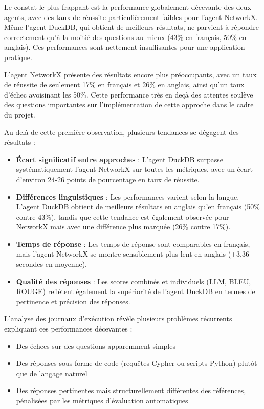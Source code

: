 \documentclass[a4paper,11pt]{article}
\begin{document}
Le constat le plus frappant est la performance globalement décevante des deux agents, avec des taux de réussite particulièrement faibles pour l'agent NetworkX. Même l'agent DuckDB, qui obtient de meilleurs résultats, ne parvient à répondre correctement qu'à la moitié des questions au mieux (43\% en français, 50\% en anglais). Ces performances sont nettement insuffisantes pour une application pratique.

L'agent NetworkX présente des résultats encore plus préoccupants, avec un taux de réussite de seulement 17\% en français et 26\% en anglais, ainsi qu'un taux d'échec avoisinant les 50\%. Cette performance très en deçà des attentes soulève des questions importantes sur l'implémentation de cette approche dans le cadre du projet.

Au-delà de cette première observation, plusieurs tendances se dégagent des résultats :

\begin{itemize}
    \item \textbf{Écart significatif entre approches} : L'agent DuckDB surpasse systématiquement l'agent NetworkX sur toutes les métriques, avec un écart d'environ 24-26 points de pourcentage en taux de réussite.
    
    \item \textbf{Différences linguistiques} : Les performances varient selon la langue. L'agent DuckDB obtient de meilleurs résultats en anglais qu'en français (50\% contre 43\%), tandis que cette tendance est également observée pour NetworkX mais avec une différence plus marquée (26\% contre 17\%).
    
    \item \textbf{Temps de réponse} : Les temps de réponse sont comparables en français, mais l'agent NetworkX se montre sensiblement plus lent en anglais (+3,36 secondes en moyenne).
    
    \item \textbf{Qualité des réponses} : Les scores combinés et individuels (LLM, BLEU, ROUGE) reflètent également la supériorité de l'agent DuckDB en termes de pertinence et précision des réponses.
\end{itemize}

L'analyse des journaux d'exécution révèle plusieurs problèmes récurrents expliquant ces performances décevantes :

\begin{itemize}
    \item Des échecs sur des questions apparemment simples
    \item Des réponses sous forme de code (requêtes Cypher ou scripts Python) plutôt que de langage naturel
    \item Des réponses pertinentes mais structurellement différentes des références, pénalisées par les métriques d'évaluation automatiques
\end{itemize}
\end{document}
